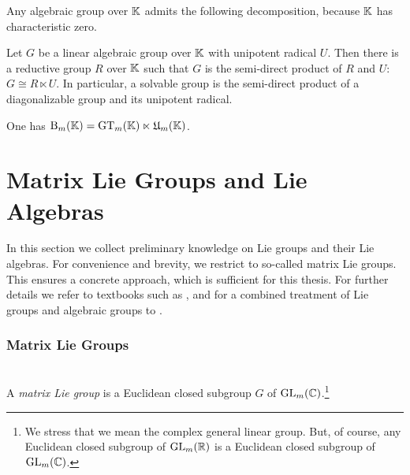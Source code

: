 Any algebraic group over $\mathbb K$ admits the following decomposition, because $\mathbb K$ has characteristic zero.

\begin{theorem} \label{thm:LeviDecomposition}
	Let $G$ be a linear algebraic group over $\mathbb K$ with unipotent radical $U$. Then there is a reductive group $R$ over $\mathbb K$ such that $G$ is the semi-direct product of $R$ and $U$: $G \cong R \ltimes U$. In particular, a solvable group is the semi-direct product of a diagonalizable group and its unipotent radical.
\end{theorem}

\begin{example}
	One has $\operatorname{B}_m(\mathbb K) = \operatorname{GT}_m(\mathbb K) \ltimes \mathfrak{U}_m(\mathbb K)$.
	\hfill\exSymbol
\end{example}








\section{Matrix Lie Groups and Lie Algebras} \label{sec:MatrixLieGroups}

In this section we collect preliminary knowledge on Lie groups and their Lie algebras. For convenience and brevity, we restrict to so-called matrix Lie groups. This ensures a concrete approach, which is sufficient for this thesis. For further details we refer to textbooks such as \cite{HallBook, KnappBook, LeeSmoothManifolds}, and for a combined treatment of Lie groups and algebraic groups to \cite{borel2006lie, GoodmanWallachBook, OnishchikVinbergBook, ProcesiBook}. 

\subsubsection{Matrix Lie Groups}

\begin{defn}\label{defn:MatrixLieGroup}
	\ \\
	A \emph{matrix Lie group} is a Euclidean closed subgroup $G$ of $\operatorname{GL}_m(\mathbb C)$.\footnote{We stress that we mean the complex general linear group. But, of course, any Euclidean closed subgroup of $\operatorname{GL}_m(\mathbb R)$ is a Euclidean closed subgroup of $\operatorname{GL}_m(\mathbb C)$.}
	\hfill{}
\end{defn}

